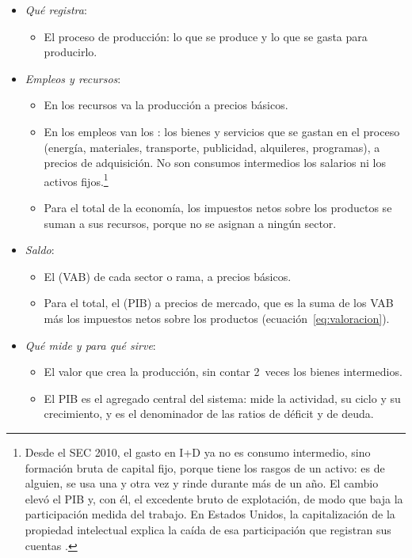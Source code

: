 \documentclass[11pt]{article}
\begin{document}
\begin{itemize}
\item \emph{Qué registra}:
  \begin{itemize}
  \item El proceso de producción: lo que se produce y lo que se gasta para producirlo.
  \end{itemize}
\item \emph{Empleos y recursos}:
  \begin{itemize}
  \item En los recursos va la producción a precios básicos.
  \item En los empleos van los : los bienes y servicios que se gastan en el proceso (energía, materiales, transporte, publicidad, alquileres, programas), a precios de adquisición. No son consumos intermedios los salarios ni los activos fijos.\footnote{Desde el SEC 2010, el gasto en I+D ya no es consumo intermedio, sino formación bruta de capital fijo, porque tiene los rasgos de un activo: es de alguien, se usa una y otra vez y rinde durante más de un año. El cambio elevó el PIB y, con él, el excedente bruto de explotación, de modo que baja la participación medida del trabajo. En Estados Unidos, la capitalización de la propiedad intelectual explica la caída de esa participación que registran sus cuentas\nocite{KohSantaeulaliaZheng2020} .}
  \item Para el total de la economía, los impuestos netos sobre los productos se suman a sus recursos, porque no se asignan a ningún sector.
  \end{itemize}
\item \emph{Saldo}:
  \begin{itemize}
  \item El  (VAB) de cada sector o rama, a precios básicos.
  \item Para el total, el  (PIB) a precios de mercado, que es la suma de los VAB más los impuestos netos sobre los productos (ecuación~\eqref{eq:valoracion}).
  \end{itemize}
\item \emph{Qué mide y para qué sirve}:
  \begin{itemize}
  \item El valor que crea la producción, sin contar 2~veces los bienes intermedios.
  \item El PIB es el agregado central del sistema: mide la actividad, su ciclo y su crecimiento, y es el denominador de las ratios de déficit y de deuda.
  \end{itemize}
\end{itemize}
\end{document}
